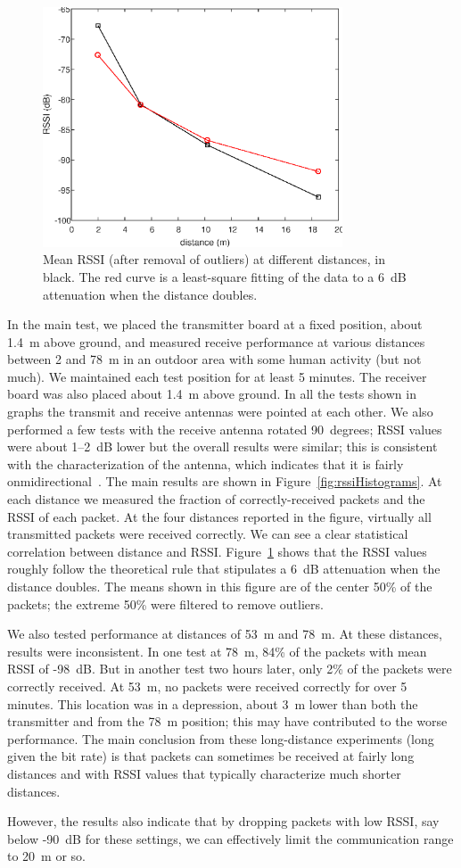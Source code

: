 \begin{figure}[h]
    \centering
    \includegraphics[width=3.5in]{experiments/rssiDistance.eps}
    \caption{Mean RSSI (after removal of outliers) at different distances, in black. The red curve is a least-square
    fitting of the data to a 6~dB attenuation when the distance doubles.}
    \label{fig:rssiDistance}
\end{figure}

In the main test, we placed the transmitter board at a fixed position, about 1.4~m above ground, and measured receive
performance at various distances between 2 and 78~m in an outdoor area with some human activity (but not much). We 
maintained each test position for at least 5 minutes.
The receiver board was also placed about 1.4~m above ground. In all the tests shown in graphs the transmit
and receive antennas were pointed at each other. We also performed a few tests with the receive antenna rotated 90~degrees;
RSSI values were about 1--2~dB lower but the overall results were similar; this is consistent with the characterization
of the antenna, which indicates that it is fairly onmidirectional~\cite{LAUNCHXL-CC1350-4}.
The main results are shown in Figure~\ref{fig:rssiHistograms}.
At each distance we measured the fraction of correctly-received packets and the RSSI of each packet. At the four
distances reported in the figure, virtually all transmitted packets were received correctly. We can see a clear
statistical correlation between distance and RSSI. Figure~\ref{fig:rssiDistance} shows that the RSSI values
roughly follow the theoretical rule that stipulates a 6~dB attenuation when the distance doubles. The means
shown in this figure are of the center 50\% of the packets; the extreme 50\% were filtered to remove outliers.

We also tested performance at distances of 53~m and 78~m. At these distances, results were inconsistent. In one test
at 78~m, 84\% of the packets with mean RSSI of -98~dB. But in another test two hours later, only 2\% of the packets
were correctly received. At 53~m, no packets were received correctly for over 5 minutes. This location was in a depression,
about 3~m lower than both the transmitter and from the 78~m position; this may have contributed to the worse performance.
The main conclusion from these long-distance experiments (long given the bit rate) is that packets can sometimes be received
at fairly long distances and with RSSI values that typically characterize much shorter distances. 

However, the results also indicate that by dropping packets with low RSSI, say below -90~dB for these settings, we can
effectively limit the communication range to 20~m or so.
